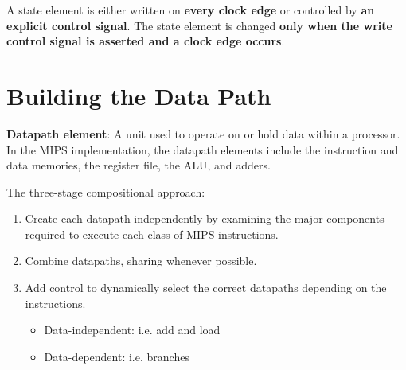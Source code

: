 \documentclass[10pt,a4paper]{article}
\begin{document}
A state element is either written on \textbf{every clock edge} or controlled by \textbf{an explicit
control signal}. The state element is changed \textbf{only when the write control signal is asserted
and a clock edge occurs}.

\section{Building the Data Path}

\begin{tcolorbox}[breakable,colback=white]
\textbf{Datapath element}: A unit used to operate on or hold data within a processor. In the MIPS
implementation, the datapath elements include the instruction and data memories, the register file, the ALU, and adders.
\end{tcolorbox}

The three-stage compositional approach: 
\begin{enumerate}
    \item Create each datapath independently by examining the major components required to execute
    each class of MIPS instructions.
    \item Combine datapaths, sharing whenever possible.
    \item Add control to dynamically select the correct datapaths depending on the instructions.
    \begin{itemize}
        \item Data-independent: i.e. add and load
        \item Data-dependent: i.e. branches
    \end{itemize}
\end{enumerate}
\end{document}
